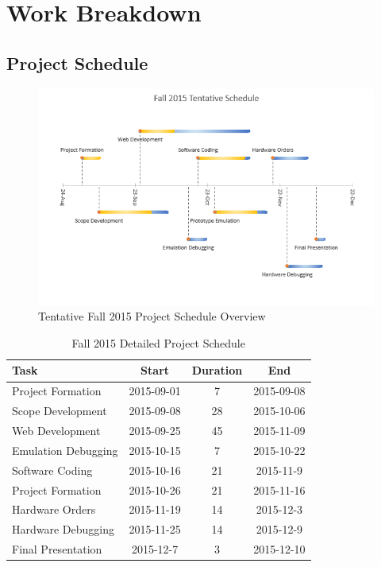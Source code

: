 \chapter{Work Breakdown}

\section{Project Schedule}

\begin{figure}[!ht]
\centering
\includegraphics[scale=0.65]{./figures/fall-timeline}
\caption{Tentative Fall 2015 Project Schedule Overview}
\label{figure:fall-timeline}
\end{figure}

\begin{table}
\centering
\begin{tabular}{l  c  c  c}
Task & Start & Duration & End \\
\hline
Project Formation & 2015-09-01 & 7 & 2015-09-08 \\
Scope Development & 2015-09-08 & 28 & 2015-10-06 \\
Web Development & 2015-09-25 & 45 & 2015-11-09 \\
Emulation Debugging & 2015-10-15 & 7 & 2015-10-22 \\
Software Coding & 2015-10-16 & 21 & 2015-11-9 \\
Project Formation & 2015-10-26 & 21 & 2015-11-16 \\
Hardware Orders & 2015-11-19 & 14 & 2015-12-3 \\
Hardware Debugging & 2015-11-25 & 14 & 2015-12-9 \\
Final Presentation & 2015-12-7 & 3 & 2015-12-10 \\
\end{tabular}
\caption{Fall 2015 Detailed Project Schedule}
\label{table:risk}
\end{table}
\vspace{0.3cm}

